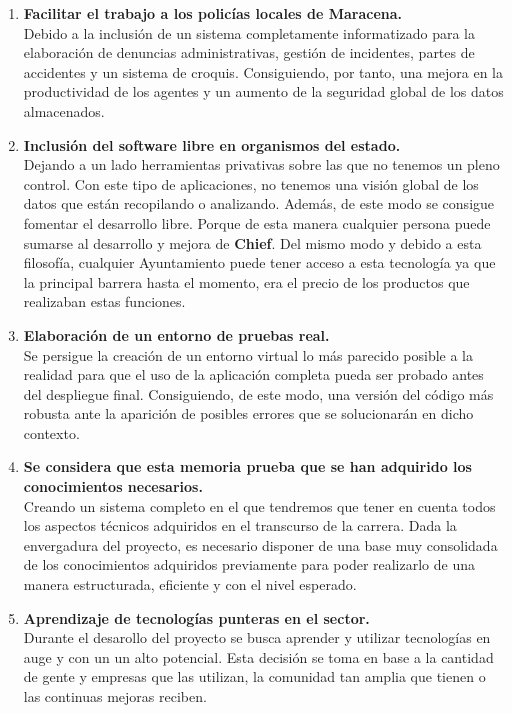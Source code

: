 \begin{enumerate}

    \item \textbf{Facilitar el trabajo a los policías locales de Maracena.}\\
    Debido a la inclusión de un sistema completamente informatizado para la elaboración de 
    denuncias administrativas, gestión de incidentes, partes de accidentes y un sistema de croquis. Consiguiendo,
    por tanto, una mejora en la productividad de los agentes y un aumento de la seguridad
    global de los datos almacenados.
    
    \item \textbf{Inclusión del software libre en organismos del estado.}\\
    Dejando a un lado herramientas privativas sobre las que no tenemos un pleno control. Con este tipo de aplicaciones, no tenemos una visión global
    de los datos que están recopilando o analizando. Además, de este modo se consigue fomentar el desarrollo libre. Porque 
    de esta manera cualquier persona puede sumarse al desarrollo y mejora de \textbf{Chief}. Del mismo modo y debido a esta filosofía, cualquier Ayuntamiento puede tener acceso a esta tecnología ya que la principal barrera hasta el momento, era el precio de los productos que realizaban estas funciones.

    \item \textbf{Elaboración de un entorno de pruebas real.}\\
    Se persigue la creación de un entorno virtual lo más parecido posible a la 
    realidad para que el uso de la aplicación completa pueda ser probado antes del despliegue 
    final. Consiguiendo, de este modo, una versión del código más robusta ante la aparición de posibles errores que se solucionarán en dicho contexto.
   	
    \item \textbf{Se considera que esta memoria prueba que se han adquirido los conocimientos necesarios.}\\
    Creando un sistema completo en el que tendremos que tener en cuenta todos los 
    aspectos técnicos adquiridos en el transcurso de la carrera. Dada la envergadura del
    proyecto, es necesario disponer de una base muy consolidada de los conocimientos adquiridos
    previamente para poder realizarlo de una manera estructurada, eficiente y con el nivel esperado.

    \item \textbf{Aprendizaje de tecnologías punteras en el sector.}\\
    Durante el desarollo del proyecto se busca aprender y utilizar tecnologías en 
    auge y con un un alto potencial. Esta decisión se toma en base  a la cantidad de gente
    y empresas que las utilizan, la comunidad tan amplia que tienen o las continuas
    mejoras reciben.

\end{enumerate}

